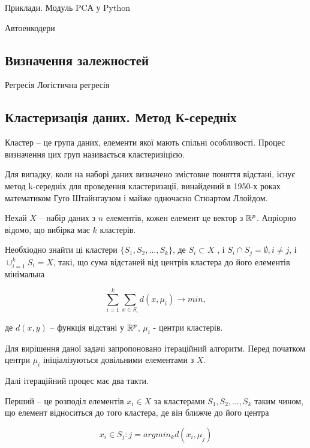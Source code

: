 Приклади. Модуль PCА у Python

Автоенкодери

\subsection{Визначення залежностей}

Регресія
Логістична регресія

\subsection{Кластеризація даних. Метод К-середніх}

\begin{ozn}
 Кластер -- це група даних, елементи якої мають спільні особливості. Процес визначення цих груп називається кластеризіцією. 
\end{ozn}

Для випадку, коли на наборі даних визначено змістовне поняття відстані, існує метод k-середніх для проведення кластеризації, винайдений в 1950-х роках математиком Гуґо Штайнгаузом і майже одночасно Стюартом Ллойдом.

Нехай $X$ -- набір даних з $n$ елементів, кожен елемент це вектор з $\Bbb R^p$. Апріорно відомо, що вибірка має $k$ кластерів.

Необхіодно знайти ці кластери $\{S_1, S_2, \ldots, S_k\}$, де $S_i \subset X$ , і $S_i \cap S_j = \emptyset, i\ne j$, і $\cup_{i=1}^{k} S_i = X$, такі, що сума відстаней від центрів кластера до його елементів мінімальна

\begin{equation}
 \sum_{i=1}^{k} \sum_{x\in S_i} d(x, \mu_i) \rightarrow min,
\end{equation}

де $d(x, y)$ -- функція відстані у $\Bbb R^p$, $\mu_i$ - центри кластерів.

Для вирішення даної задачі запропоновано ітераційний алгоритм. Перед початком центри $\mu_i$ ініціалізуються довільними елементами з $X$.

Далі ітераційний процес має два такти. 

Перший -- це розподіл елементів $x_i \in X$ за кластерами $S_1, S_2, \ldots, S_k$ таким чином, що елемент відноситься до того кластера, де він ближче до його центра

\begin{equation}
 x_i \in S_j: j = argmin_k d(x_i, \mu_j)
\end{equation}

